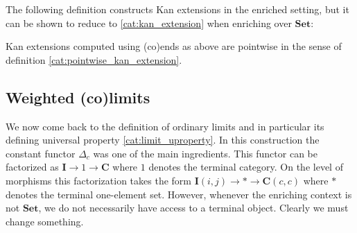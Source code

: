     The following definition constructs Kan extensions in the enriched setting, but it can be shown to reduce to \ref{cat:kan_extension} when enriching over $\mathbf{Set}$:
    \begin{property}
        Kan extensions computed using (co)ends as above are pointwise in the sense of definition \ref{cat:pointwise_kan_extension}.
    \end{property}


\subsection{Weighted (co)limits}

    We now come back to the definition of ordinary limits and in particular its defining universal property \ref{cat:limit_uproperty}. In this construction the constant functor $\Delta_c$ was one of the main ingredients. This functor can be factorized as $\mathbf{I}\rightarrow1\rightarrow\mathbf{C}$ where $1$ denotes the terminal category. On the level of morphisms this factorization takes the form $\mathbf{I}(i, j)\rightarrow\ast\rightarrow\mathbf{C}(c, c)$ where $\ast$ denotes the terminal one-element set. However, whenever the enriching context is not $\mathbf{Set}$, we do not necessarily have access to a terminal object. Clearly we must change something.

